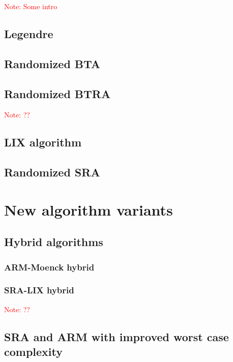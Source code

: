 \documentclass{article}
\newcounter{algo}
\newcommand{\Notes}[1]{\textcolor{red}{Note: #1}}
\begin{document}
\Notes{Some intro}

\subsection{Legendre}
\label{sec:legendre}

\subsection{Randomized BTA}
\label{sec:BTArand}

\subsection{Randomized BTRA}
\label{sec:BTRArand}
\Notes{??}

\subsection{LIX algorithm}
\label{sec:LIXrand}

\subsection{Randomized SRA}
\label{sec:SRArand}




\section{New algorithm variants}
\label{sec:new-variants}

\subsection{Hybrid algorithms}
\label{sec:hybrid-algorithms}

\subsubsection{ARM-Moenck hybrid}
\subsubsection{SRA-LIX hybrid}
\Notes{??}



\subsection{SRA and ARM with improved worst case complexity}
\label{sec:worst-case}
\end{document}
